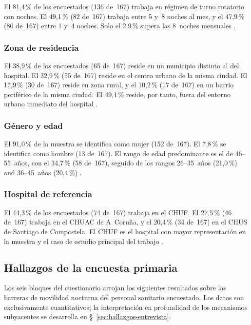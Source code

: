 El 81{,}4\,\% de los encuestados (136 de~167) trabaja en régimen de turno rotatorio con noches. El 49{,}1\,\% (82 de~167) trabaja entre 5 y~8 noches al mes, y el 47{,}9\,\% (80 de~167) entre 1 y~4 noches. Solo el 2{,}9\,\% supera las 8~noches mensuales \parencite{LouridoRegueira2026}.

\subsubsection{Zona de residencia}
\label{sec:zona-residencia}

El 38{,}9\,\% de los encuestados (65 de~167) reside en un municipio distinto al del hospital. El 32{,}9\,\% (55 de~167) reside en el centro urbano de la misma ciudad. El 17{,}9\,\% (30 de~167) reside en zona rural, y el 10{,}2\,\% (17 de~167) en un barrio periférico de la misma ciudad. El 49{,}1\,\% reside, por tanto, fuera del entorno urbano inmediato del hospital \parencite{LouridoRegueira2026}.

\subsubsection{Género y edad}
\label{sec:genero-edad}

El 91{,}0\,\% de la muestra se identifica como mujer (152 de~167). El 7{,}8\,\% se identifica como hombre (13 de~167). El rango de edad predominante es el de 46--55~años, con el 34{,}7\,\% (58 de~167), seguido de los rangos 26--35~años (21{,}0\,\%) and 36--45~años (20{,}4\,\%) \parencite{LouridoRegueira2026}.

\subsubsection{Hospital de referencia}
\label{sec:hospital-referencia}

El 44{,}3\,\% de los encuestados (74 de~167) trabaja en el \acs{CHUF}. El 27{,}5\,\% (46 de~167) trabaja en el CHUAC de A~Coruña, y el 20{,}4\,\% (34 de~167) en el CHUS de Santiago de Compostela. El \acs{CHUF} es el hospital con mayor representación en la muestra y el caso de estudio principal del trabajo \parencite{LouridoRegueira2026}.

\subsection{Hallazgos de la encuesta primaria}
\label{sec:hallazgos-encuesta}

Los seis bloques del cuestionario arrojan los siguientes resultados sobre las barreras de movilidad nocturna del personal sanitario encuestado. Los datos son exclusivamente cuantitativos; la interpretación en profundidad de los mecanismos subyacentes se desarrolla en §~\ref{sec:hallazgos-entrevista}.

